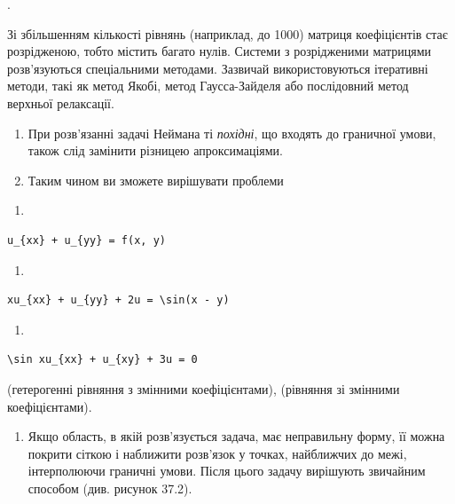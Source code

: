 \documentclass[
  ukrainian,
]{article}
\providecommand{\tightlist}{%
  \setlength{\itemsep}{0pt}\setlength{\parskip}{0pt}}
\begin{document}
.

Зі збільшенням кількості рівнянь (наприклад, до 1000) матриця
коефіцієнтів стає розрідженою, тобто містить багато нулів. Системи з
розрідженими матрицями розв'язуються спеціальними методами. Зазвичай
використовуються ітеративні методи, такі як метод Якобі, метод
Гаусса-Зайделя або послідовний метод верхньої релаксації.

\begin{enumerate}
\def\labelenumi{\arabic{enumi}.}
\setcounter{enumi}{3}
\item
  При розв'язанні задачі Неймана ті \emph{похідні}, що входять до
  граничної умови, також слід замінити різницею апроксимаціями.
\item
  Таким чином ви зможете вирішувати проблеми
\end{enumerate}

\begin{enumerate}
\def\labelenumi{\alph{enumi})}
\tightlist
\item
\end{enumerate}

\begin{verbatim}
u_{xx} + u_{yy} = f(x, y)
\end{verbatim}

\begin{enumerate}
\def\labelenumi{\arabic{enumi})}
\setcounter{enumi}{5}
\tightlist
\item
\end{enumerate}

\begin{verbatim}
xu_{xx} + u_{yy} + 2u = \sin(x - y)
\end{verbatim}

\begin{enumerate}
\def\labelenumi{\Alph{enumi})}
\setcounter{enumi}{1}
\tightlist
\item
\end{enumerate}

\begin{verbatim}
\sin xu_{xx} + u_{xy} + 3u = 0
\end{verbatim}

(гетерогенні рівняння з змінними коефіцієнтами), (рівняння зі змінними
коефіцієнтами).

\begin{enumerate}
\def\labelenumi{\arabic{enumi}.}
\setcounter{enumi}{5}
\tightlist
\item
  Якщо область, в якій розв'язується задача, має неправильну форму, її
  можна покрити сіткою і наближити розв'язок у точках, найближчих до
  межі, інтерполюючи граничні умови. Після цього задачу вирішують
  звичайним способом (див. рисунок 37.2).
\end{enumerate}
\end{document}
